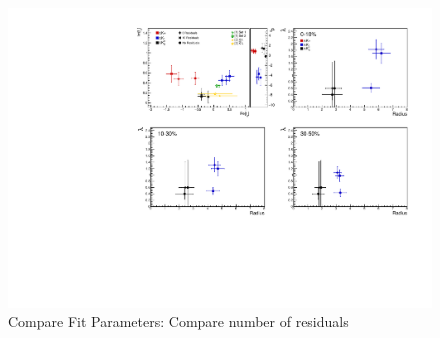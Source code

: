\documentclass[../AnalysisNoteJBuxton.tex]{subfiles}
\begin{document}
\begin{figure}[h]
  \centering
  \includegraphics[width=\textwidth]{7_ResultsAndDiscussion/Figures/CompareAllScattParams_CompNumRes_StatOnly.pdf}
  \caption[Compare Fit Parameters: Compare number of residuals]{Compare Fit Parameters: Compare number of residuals}
  \label{fig:CompareAllScattParams_CompNumRes}
\end{figure}
\end{document}
